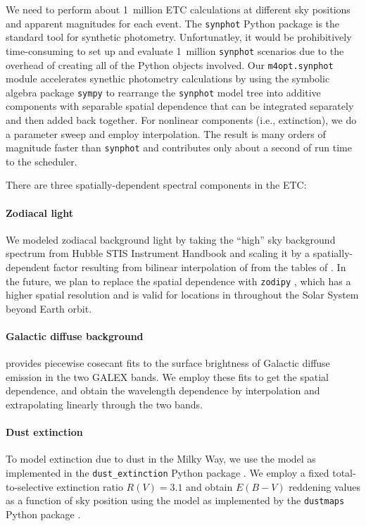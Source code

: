 \documentclass[twocolumn,times]{aastex631}
\begin{document}
We need to perform about 1~million \ac{ETC} calculations at different sky positions and apparent magnitudes for each event. The \texttt{synphot} Python package \citep{2018ascl.soft11001S} is the standard tool for synthetic photometry. Unfortunatley, it would be prohibitively time-consuming to set up and evaluate 1~million \texttt{synphot} scenarios due to the overhead of creating all of the Python objects involved. Our \texttt{m4opt.synphot} module accelerates synethic photometry calculations by using the symbolic algebra package \texttt{sympy} \citep{10.7717/peerj-cs.103} to rearrange the \texttt{synphot} model tree into additive components with separable spatial dependence that can be integrated separately and then added back together. For nonlinear components (i.e., extinction), we do a parameter sweep and employ interpolation. The result is many orders of magnitude faster than \texttt{synphot} and contributes only about a second of run time to the scheduler.

There are three spatially-dependent spectral components in the \ac{ETC}:

\paragraph{Zodiacal light}
We modeled zodiacal background light by taking the ``high'' sky background spectrum from Hubble \ac{STIS} Instrument Handbook \citep{2024stis.rept....5R} and scaling it by a spatially-dependent factor resulting from bilinear interpolation of from the tables of \citet{1998A&AS..127....1L}. In the future, we plan to replace the spatial dependence with \texttt{zodipy} \citep{2022A&A...666A.107S,2024JOSS....9.6648S}, which has a higher spatial resolution and is valid for locations in throughout the Solar System beyond Earth orbit.

\paragraph{Galactic diffuse background}
\citet{2014ApJS..213...32M} provides piecewise cosecant fits to the surface brightness of Galactic diffuse emission in the two GALEX bands. We employ these fits to get the spatial dependence, and obtain the wavelength dependence by interpolation and extrapolating linearly through the two bands.

\paragraph{Dust extinction}
To model extinction due to dust in the Milky Way, we use the \citet{2023ApJ...950...86G} model as implemented in the \texttt{dust\_extinction} Python package \citep{2024JOSS....9.7023G}. We employ a fixed total-to-selective extinction ratio $R(V) = 3.1$ and obtain $E(B-V)$ reddening values as a function of sky position using the \citet{2016A&A...596A.109P} model as implemented by the \texttt{dustmaps} Python package \citep{2018JOSS....3..695M}.
\end{document}
